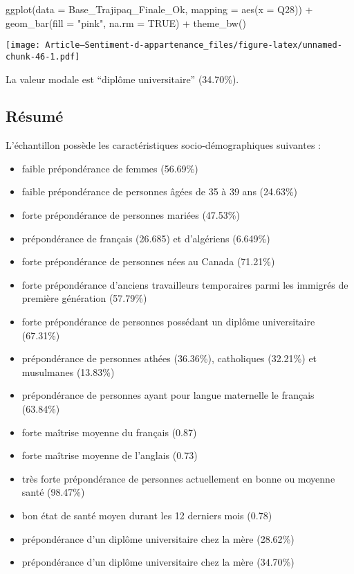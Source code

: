 \documentclass[
]{article}
\newenvironment{Shaded}{\begin{snugshade}}{\end{snugshade}}
\newcommand{\AttributeTok}[1]{\textcolor[rgb]{0.77,0.63,0.00}{#1}}
\newcommand{\ConstantTok}[1]{\textcolor[rgb]{0.00,0.00,0.00}{#1}}
\newcommand{\FunctionTok}[1]{\textcolor[rgb]{0.00,0.00,0.00}{#1}}
\newcommand{\NormalTok}[1]{#1}
\newcommand{\SpecialCharTok}[1]{\textcolor[rgb]{0.00,0.00,0.00}{#1}}
\newcommand{\StringTok}[1]{\textcolor[rgb]{0.31,0.60,0.02}{#1}}
\providecommand{\tightlist}{%
  \setlength{\itemsep}{0pt}\setlength{\parskip}{0pt}}
\begin{document}
\begin{Shaded}
\begin{Highlighting}[]
\FunctionTok{ggplot}\NormalTok{(}\AttributeTok{data =}\NormalTok{ Base\_Trajipaq\_Finale\_Ok, }\AttributeTok{mapping =} \FunctionTok{aes}\NormalTok{(}\AttributeTok{x =}\NormalTok{ Q28)) }\SpecialCharTok{+}
  \FunctionTok{geom\_bar}\NormalTok{(}\AttributeTok{fill =} \StringTok{"pink"}\NormalTok{, }\AttributeTok{na.rm =} \ConstantTok{TRUE}\NormalTok{) }\SpecialCharTok{+}
  \FunctionTok{theme\_bw}\NormalTok{()}
\end{Highlighting}
\end{Shaded}

\texttt{[image: Article---Sentiment-d-appartenance\_files/figure-latex/unnamed-chunk-46-1.pdf]}

La valeur modale est ``diplôme universitaire'' (34.70\%).

\hypertarget{ruxe9sumuxe9}{%
\subsection{Résumé}\label{ruxe9sumuxe9}}

L'échantillon possède les caractéristiques socio-démographiques
suivantes :

\begin{itemize}
\tightlist
\item
  faible prépondérance de femmes (56.69\%)
\item
  faible prépondérance de personnes âgées de 35 à 39 ans (24.63\%)
\item
  forte prépondérance de personnes mariées (47.53\%)
\item
  prépondérance de français (26.685) et d'algériens (6.649\%)
\item
  forte prépondérance de personnes nées au Canada (71.21\%)
\item
  forte prépondérance d'anciens travailleurs temporaires parmi les
  immigrés de première génération (57.79\%)
\item
  forte prépondérance de personnes possédant un diplôme universitaire
  (67.31\%)
\item
  prépondérance de personnes athées (36.36\%), catholiques (32.21\%) et
  musulmanes (13.83\%)
\item
  prépondérance de personnes ayant pour langue maternelle le français
  (63.84\%)
\item
  forte maîtrise moyenne du français (0.87)
\item
  forte maîtrise moyenne de l'anglais (0.73)
\item
  très forte prépondérance de personnes actuellement en bonne ou moyenne
  santé (98.47\%)
\item
  bon état de santé moyen durant les 12 derniers mois (0.78)
\item
  prépondérance d'un diplôme universitaire chez la mère (28.62\%)
\item
  prépondérance d'un diplôme universitaire chez la mère (34.70\%)
\end{itemize}
\end{document}
